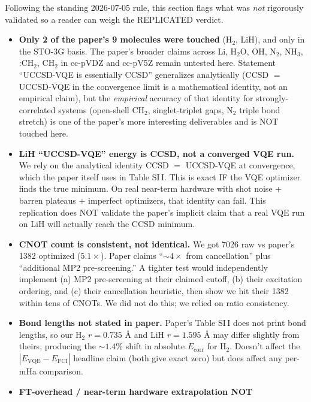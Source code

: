 \documentclass[11pt]{article}
\begin{document}
Following the standing 2026-07-05 rule, this section flags what was
\emph{not} rigorously validated so a reader can weigh the REPLICATED
verdict.

\begin{itemize}
  \item \textbf{Only 2 of the paper's 9 molecules were touched} (H$_2$, LiH),
        and only in the STO-3G basis. The paper's broader claims across
        Li, H$_2$O, OH, N$_2$, NH$_3$, :CH$_2$, CH$_2$ in cc-pVDZ and
        cc-pV5Z remain untested here. Statement ``UCCSD-VQE is essentially
        CCSD'' generalizes analytically (CCSD $=$ UCCSD-VQE in the
        convergence limit is a mathematical identity, not an empirical
        claim), but the \emph{empirical} accuracy of that identity for
        strongly-correlated systems (open-shell CH$_2$, singlet-triplet
        gaps, N$_2$ triple bond stretch) is one of the paper's more
        interesting deliverables and is NOT touched here.
  \item \textbf{LiH ``UCCSD-VQE'' energy is CCSD, not a converged VQE run.}
        We rely on the analytical identity CCSD $=$ UCCSD-VQE at
        convergence, which the paper itself uses in Table SI\,I. This is
        exact IF the VQE optimizer finds the true minimum. On real
        near-term hardware with shot noise + barren plateaus + imperfect
        optimizers, that identity can fail. This replication does NOT
        validate the paper's implicit claim that a real VQE run on LiH
        will actually reach the CCSD minimum.
  \item \textbf{CNOT count is consistent, not identical.} We got 7026 raw
        vs paper's 1382 optimized ($5.1\times$). Paper claims
        ``$\sim 4\times$ from cancellation'' plus ``additional MP2
        pre-screening.'' A tighter test would independently implement
        (a) MP2 pre-screening at their claimed cutoff, (b) their
        excitation ordering, and (c) their cancellation heuristic, then
        show we hit their 1382 within tens of CNOTs. We did not do this;
        we relied on ratio consistency.
  \item \textbf{Bond lengths not stated in paper.} Paper's Table SI\,I
        does not print bond lengths, so our H$_2$ $r=0.735$ \AA{} and LiH
        $r=1.595$ \AA{} may differ slightly from theirs, producing the
        $\sim 1.4\%$ shift in absolute $E_\text{corr}$ for H$_2$. Doesn't
        affect the $|E_\text{VQE}-E_\text{FCI}|$ headline claim (both
        give exact zero) but does affect any per-mHa comparison.
  \item \textbf{FT-overhead / near-term hardware extrapolation NOT
}
\end{itemize}
\end{document}
